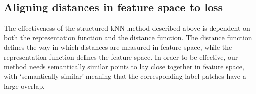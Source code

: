 \documentclass[a4paper,titlepage]{article}
\newcommand{\mat}[1]{\mathbf{#1}}
\begin{document}

\subsection{Aligning distances in feature space to loss}

The effectiveness of the structured \ac{kNN} method described above is dependent on both the representation function and the distance function. The  distance function defines the way in which distances are measured in feature space, while the representation function defines the feature space. In order to be effective, our method needs semantically similar points to lay close together in feature space, with `semantically similar' meaning that the corresponding label patches have a large overlap.
\end{document}

